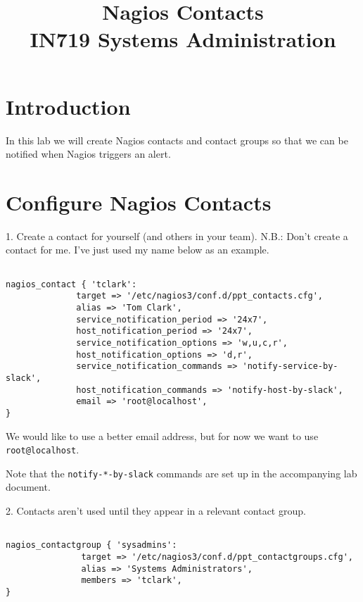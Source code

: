 \documentclass{article}         %
\title{Nagios Contacts\\ IN719 Systems Administration}
\date{}                                                 %
\begin{document}
\maketitle

\section*{Introduction}
In this lab we will create Nagios contacts and contact groups so that we can be notified
when Nagios triggers an alert.




\section{Configure Nagios Contacts}


1.  Create a contact for yourself (and others in your team). N.B.: Don't 
create a contact for me. I've just used my name below as an example.

\begin{verbatim}

nagios_contact { 'tclark':
              target => '/etc/nagios3/conf.d/ppt_contacts.cfg',
              alias => 'Tom Clark',
              service_notification_period => '24x7',
              host_notification_period => '24x7',
              service_notification_options => 'w,u,c,r',
              host_notification_options => 'd,r',
              service_notification_commands => 'notify-service-by-slack',
              host_notification_commands => 'notify-host-by-slack',
              email => 'root@localhost',
}

  \end{verbatim}

We would like to use a better email address, but for now we want to use
\texttt{root@localhost}.

Note that the \texttt{notify-*-by-slack} commands are set up in the accompanying lab document.

2. Contacts aren't used until they appear in a relevant contact group.

\begin{verbatim}

nagios_contactgroup { 'sysadmins':
               target => '/etc/nagios3/conf.d/ppt_contactgroups.cfg',
               alias => 'Systems Administrators',
               members => 'tclark', 
}

  \end{verbatim}
\end{document}

